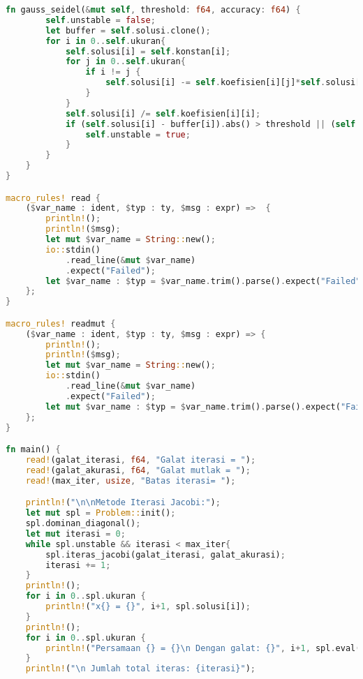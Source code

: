 \documentclass[12pt]{article}
\begin{document}
\begin{enumerate}
{\begin{lstlisting}[language=Rust, style=colouredRust, basicstyle=\fontsize{6.7pt}{8pt}\selectfont\color{white}\ttfamily]
    fn gauss_seidel(&mut self, threshold: f64, accuracy: f64) {
        self.unstable = false;
        let buffer = self.solusi.clone();
        for i in 0..self.ukuran{
            self.solusi[i] = self.konstan[i];
            for j in 0..self.ukuran{
                if i != j {
                    self.solusi[i] -= self.koefisien[i][j]*self.solusi[j];
                }
            }
            self.solusi[i] /= self.koefisien[i][i]; 
            if (self.solusi[i] - buffer[i]).abs() > threshold || (self.eval(i) - self.konstan[i]).abs() > accuracy {
                self.unstable = true;
            }
        }
    }
}

macro_rules! read {
    ($var_name : ident, $typ : ty, $msg : expr) =>  {
        println!();
        println!($msg);
        let mut $var_name = String::new();
        io::stdin()
            .read_line(&mut $var_name)
            .expect("Failed");
        let $var_name : $typ = $var_name.trim().parse().expect("Failed");
    };
}

macro_rules! readmut {
    ($var_name : ident, $typ : ty, $msg : expr) => {
        println!();
        println!($msg);
        let mut $var_name = String::new();
        io::stdin()
            .read_line(&mut $var_name)
            .expect("Failed");
        let mut $var_name : $typ = $var_name.trim().parse().expect("Failed");
    };
}

fn main() {
    read!(galat_iterasi, f64, "Galat iterasi = ");
    read!(galat_akurasi, f64, "Galat mutlak = "); 
    read!(max_iter, usize, "Batas iterasi= ");

    println!("\n\nMetode Iterasi Jacobi:");
    let mut spl = Problem::init();
    spl.dominan_diagonal();
    let mut iterasi = 0;
    while spl.unstable && iterasi < max_iter{
        spl.iteras_jacobi(galat_iterasi, galat_akurasi);
        iterasi += 1;
    }
    println!();
    for i in 0..spl.ukuran {
        println!("x{} = {}", i+1, spl.solusi[i]);
    }
    println!();
    for i in 0..spl.ukuran {
        println!("Persamaan {} = {}\n Dengan galat: {}", i+1, spl.eval(i), (spl.eval(i) - spl.konstan[i]).abs());
    }
    println!("\n Jumlah total iteras: {iterasi}");


\end{lstlisting}}
\end{enumerate}
\end{document}
